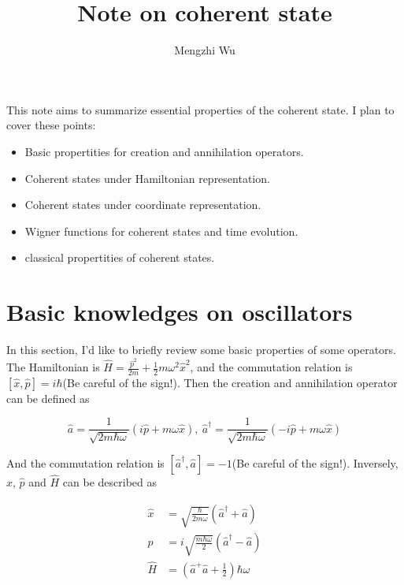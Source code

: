 \documentclass{article}
\title{Note on coherent state}
\author{Mengzhi Wu}
\begin{document}
    \maketitle

    This note aims to summarize essential properties of the coherent state. I plan to cover these points:

    \begin{itemize}
        \item Basic propertities for creation and annihilation operators.
        \item Coherent states under Hamiltonian representation.
        \item Coherent states under coordinate representation.
        \item Wigner functions for coherent states and time evolution.
        \item classical propertities of coherent states.
    \end{itemize}

    \section{Basic knowledges on oscillators}
        In this section, I'd like to briefly review some basic properties of some operators. The Hamiltonian is $\hat{H}=\frac{\hat{p}^2}{2m}+\frac{1}{2}m\omega^2\hat{x}^2$, and the commutation relation is $[\hat{x},\hat{p}]=i\hbar$(Be careful of the sign!). Then the creation and annihilation operator can be defined as 

        \begin{equation}
            \hat{a}= \frac{1}{\sqrt{2m\hbar\omega}}(i\hat{p}+m\omega\hat{x}), \ \hat{a}^\dagger=\frac{1}{\sqrt{2m\hbar\omega}}(-i\hat{p}+m\omega\hat{x})
        \end{equation}

        And the commutation relation is $[\hat{a}^\dagger, \hat{a}]=-1$(Be careful of the sign!). Inversely, $\hat{x}$, $\hat{p}$ and $\hat{H}$ can be described as 

        \begin{equation}
            \begin{split}
                \hat{x}&= \sqrt{\frac{\hbar}{2m\omega}}(\hat{a}^\dagger+\hat{a}) \\
                \hat{p}&= i\sqrt{\frac{m\hbar\omega}{2}}(\hat{a}^\dagger-\hat{a}) \\
                \hat{H}&= (\hat{a}^+\hat{a}+\frac{1}{2})\hbar\omega
            \end{split}
        \end{equation}
\end{document}
